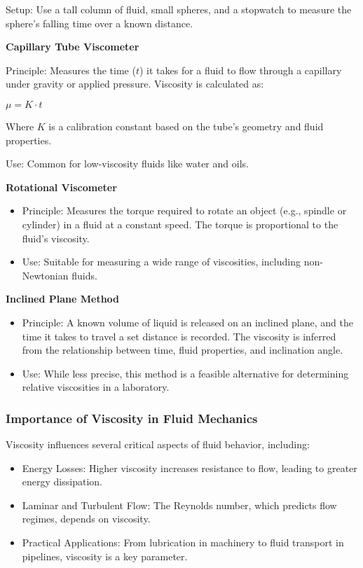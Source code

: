 \documentclass[11pt]{article}
\providecommand{\tightlist}{%
      \setlength{\itemsep}{0pt}\setlength{\parskip}{0pt}}
\begin{document}
Setup: Use a tall column of fluid, small spheres, and a stopwatch to
measure the sphere's falling time over a known distance.

\textbf{Capillary Tube Viscometer}

Principle: Measures the time (\(t\)) it takes for a fluid to flow
through a capillary under gravity or applied pressure. Viscosity is
calculated as:

\(\mu=K \cdot t\)

Where \(K\) is a calibration constant based on the tube's geometry and
fluid properties.

Use: Common for low-viscosity fluids like water and oils.

\textbf{Rotational Viscometer}

\begin{itemize}
\tightlist
\item
  Principle: Measures the torque required to rotate an object (e.g.,
  spindle or cylinder) in a fluid at a constant speed. The torque is
  proportional to the fluid's viscosity.
\item
  Use: Suitable for measuring a wide range of viscosities, including
  non-Newtonian fluids.
\end{itemize}

\textbf{Inclined Plane Method}

\begin{itemize}
\tightlist
\item
  Principle: A known volume of liquid is released on an inclined plane,
  and the time it takes to travel a set distance is recorded. The
  viscosity is inferred from the relationship between time, fluid
  properties, and inclination angle.
\item
  Use: While less precise, this method is a feasible alternative for
  determining relative viscosities in a laboratory.
\end{itemize}

\hypertarget{importance-of-viscosity-in-fluid-mechanics}{%
\subsubsection{Importance of Viscosity in Fluid
Mechanics}\label{importance-of-viscosity-in-fluid-mechanics}}

Viscosity influences several critical aspects of fluid behavior,
including:

\begin{itemize}
\tightlist
\item
  Energy Losses: Higher viscosity increases resistance to flow, leading
  to greater energy dissipation.
\item
  Laminar and Turbulent Flow: The Reynolds number, which predicts flow
  regimes, depends on viscosity.
\item
  Practical Applications: From lubrication in machinery to fluid
  transport in pipelines, viscosity is a key parameter.
\end{itemize}
\end{document}

